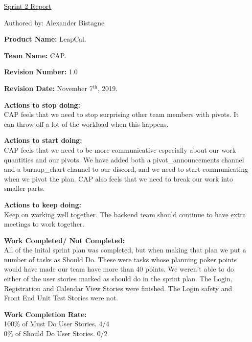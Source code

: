 \documentclass[2pt]{article}
\begin{document}
    \begin{center}
        \underline{Sprint 2 Report}
        \item Authored by: Alexander Bistagne
    \end{center}

    \begin{flushleft}
        \item \textbf{Product Name: }LeapCal.
        \item \textbf{Team Name: } CAP.
        \item \textbf{Revision Number: } 1.0
        \item \textbf{Revision Date: } November 7$^\text{th}$, 2019.
        \item \textbf{Actions to stop doing:} \\CAP feels that we need to stop surprising other team members with pivots. It can throw off a lot of the workload when this happens.
        \item \textbf{Actions to start doing:} \\CAP feels that we need to be more communicative especially about our work quantities and our pivots. We have added both a pivot\_announcements channel and a burnup\_chart channel to our discord, and we need to start communicating when we pivot the plan. CAP also feels that we need to break our work into smaller parts. 
        \item \textbf{Actions to keep doing:}\\ Keep on working well together. The backend team should continue to have extra meetings to work together.
        \item \textbf{Work Completed/ Not Completed:}\\All of the inital sprint plan was completed, but when making that plan we put a number of tasks as Should Do. These were tasks whose planning poker points would have made our team have more than 40 points. We weren't able to do either of the user stories marked as should do in the sprint plan. The Login, Registration and Calendar View Stories were finished. The Login safety and Front End Unit Test Stories were not.
        \item \textbf{Work Completion Rate:}\\
        100\% of Must Do User Stories. 4/4\\
        0\% of Should Do User Stories.   0/2  \\       

\end{flushleft}
\end{document}
